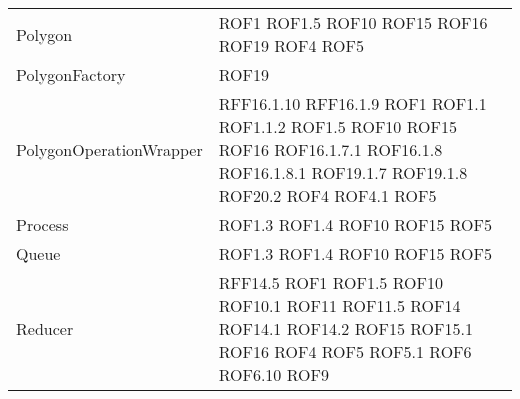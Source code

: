 \begin{longtable}{p{5cm}!{\VRule[1pt]}p{2.5cm}}
		Polygon & ROF1 \newline ROF1.5 \newline ROF10 \newline ROF15 \newline ROF16 \newline ROF19 \newline ROF4 \newline ROF5\\
		PolygonFactory & ROF19\\
		PolygonOperationWrapper & RFF16.1.10 \newline RFF16.1.9 \newline ROF1 \newline ROF1.1 \newline ROF1.1.2 \newline ROF1.5 \newline ROF10 \newline ROF15 \newline ROF16 \newline ROF16.1.7.1 \newline ROF16.1.8 \newline ROF16.1.8.1 \newline ROF19.1.7 \newline ROF19.1.8 \newline ROF20.2 \newline ROF4 \newline ROF4.1 \newline ROF5\\
		Process & ROF1.3 \newline ROF1.4 \newline ROF10 \newline ROF15 \newline ROF5\\
		Queue & ROF1.3 \newline ROF1.4 \newline ROF10 \newline ROF15 \newline ROF5\\
		Reducer & RFF14.5 \newline ROF1 \newline ROF1.5 \newline ROF10 \newline ROF10.1 \newline ROF11 \newline ROF11.5 \newline ROF14 \newline ROF14.1 \newline ROF14.2 \newline ROF15 \newline ROF15.1 \newline ROF16 \newline ROF4 \newline ROF5 \newline ROF5.1 \newline ROF6 \newline ROF6.10 \newline ROF9\\

\end{longtable}
